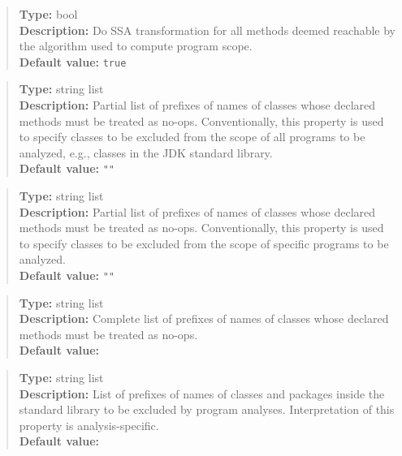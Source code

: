 \noindent {}
\begin{quote}
{\bf Type:} bool  \\
{\bf Description:} Do SSA transformation for all methods deemed reachable by the algorithm used to compute program scope. \\
{\bf Default value:} {\tt true}
\end{quote}


\noindent {}
\begin{quote}
{\bf Type:} string list \\
{\bf Description:} Partial list of prefixes of names of classes whose declared methods must be treated as no-ops.  Conventionally, this property is used to specify classes to be excluded from the scope of all programs to be analyzed, e.g., classes in the JDK standard library. \\
{\bf Default value:} {\tt ""}
\end{quote}

\noindent {}
\begin{quote}
{\bf Type:} string list \\
{\bf Description:} Partial list of prefixes of names of classes whose declared methods must be treated as no-ops.  Conventionally, this property is used to specify classes to be excluded from the scope of specific programs to be analyzed. \\
{\bf Default value:} {\tt ""}
\end{quote}

\noindent {}
\begin{quote}
{\bf Type:} string list \\
{\bf Description:} Complete list of prefixes of names of classes whose declared methods must be treated as no-ops. \\
{\bf Default value:} 
\end{quote}

\noindent {}
\begin{quote}
{\bf Type:} string list \\
{\bf Description:} List of prefixes of names of classes and packages inside the standard library to be excluded by program analyses.  Interpretation of this property is analysis-specific. \\
{\bf Default value:}  
\end{quote}

